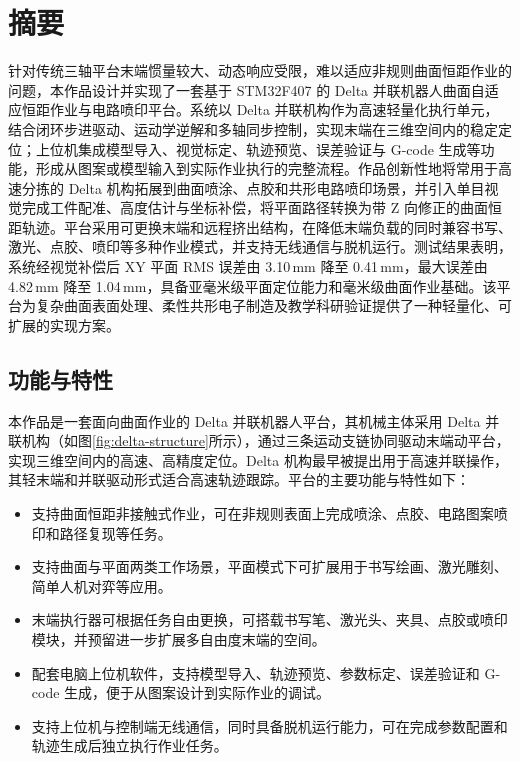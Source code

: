 ﻿\documentclass[UTF8,zihao=-4,fontset=windows]{ctexart}
\begin{document}

\section*{摘要}
针对传统三轴平台末端惯量较大、动态响应受限，难以适应非规则曲面恒距作业的问题，本作品设计并实现了一套基于 STM32F407 的 Delta 并联机器人曲面自适应恒距作业与电路喷印平台。系统以 Delta 并联机构作为高速轻量化执行单元，结合闭环步进驱动、运动学逆解和多轴同步控制，实现末端在三维空间内的稳定定位；上位机集成模型导入、视觉标定、轨迹预览、误差验证与 G-code 生成等功能，形成从图案或模型输入到实际作业执行的完整流程。作品创新性地将常用于高速分拣的 Delta 机构拓展到曲面喷涂、点胶和共形电路喷印场景，并引入单目视觉完成工件配准、高度估计与坐标补偿，将平面路径转换为带 Z 向修正的曲面恒距轨迹。平台采用可更换末端和远程挤出结构，在降低末端负载的同时兼容书写、激光、点胶、喷印等多种作业模式，并支持无线通信与脱机运行。测试结果表明，系统经视觉补偿后 XY 平面 RMS 误差由 3.10\,mm 降至 0.41\,mm，最大误差由 4.82\,mm 降至 1.04\,mm，具备亚毫米级平面定位能力和毫米级曲面作业基础。该平台为复杂曲面表面处理、柔性共形电子制造及教学科研验证提供了一种轻量化、可扩展的实现方案。


\subsection{功能与特性}
本作品是一套面向曲面作业的 Delta 并联机器人平台，其机械主体采用 Delta 并联机构（如图\ref{fig:delta-structure}所示），通过三条运动支链协同驱动末端动平台，实现三维空间内的高速、高精度定位。Delta 机构最早被提出用于高速并联操作，其轻末端和并联驱动形式适合高速轨迹跟踪\cite{clavel1988delta,hadfield2020delta}。平台的主要功能与特性如下：
\begin{itemize}
  \item 支持曲面恒距非接触式作业，可在非规则表面上完成喷涂、点胶、电路图案喷印和路径复现等任务。
  \item 支持曲面与平面两类工作场景，平面模式下可扩展用于书写绘画、激光雕刻、简单人机对弈等应用。
  \item 末端执行器可根据任务自由更换，可搭载书写笔、激光头、夹具、点胶或喷印模块，并预留进一步扩展多自由度末端的空间。
  \item 配套电脑上位机软件，支持模型导入、轨迹预览、参数标定、误差验证和 G-code 生成，便于从图案设计到实际作业的调试。
  \item 支持上位机与控制端无线通信，同时具备脱机运行能力，可在完成参数配置和轨迹生成后独立执行作业任务。
\end{itemize}
\end{document}
